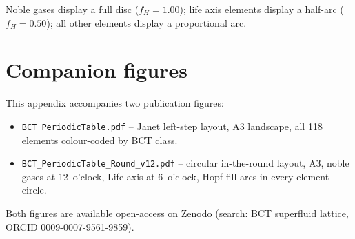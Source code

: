 \documentclass[aps,prl,onecolumn,superscriptaddress]{revtex4-2}
\begin{document}
Noble gases display a full disc ($f_H = 1.00$);
life axis elements display a half-arc ($f_H = 0.50$);
all other elements display a proportional arc.

\section{Companion figures}

This appendix accompanies two publication figures:
\begin{itemize}
\item \texttt{BCT\_PeriodicTable.pdf} -- Janet left-step layout,
  A3 landscape, all 118 elements colour-coded by BCT class.
\item \texttt{BCT\_PeriodicTable\_Round\_v12.pdf} -- circular
  in-the-round layout, A3, noble gases at 12~o'clock, Life axis
  at 6~o'clock, Hopf fill arcs in every element circle.
\end{itemize}
Both figures are available open-access on Zenodo
(search: BCT superfluid lattice, ORCID 0009-0007-9561-9859).
\end{document}
